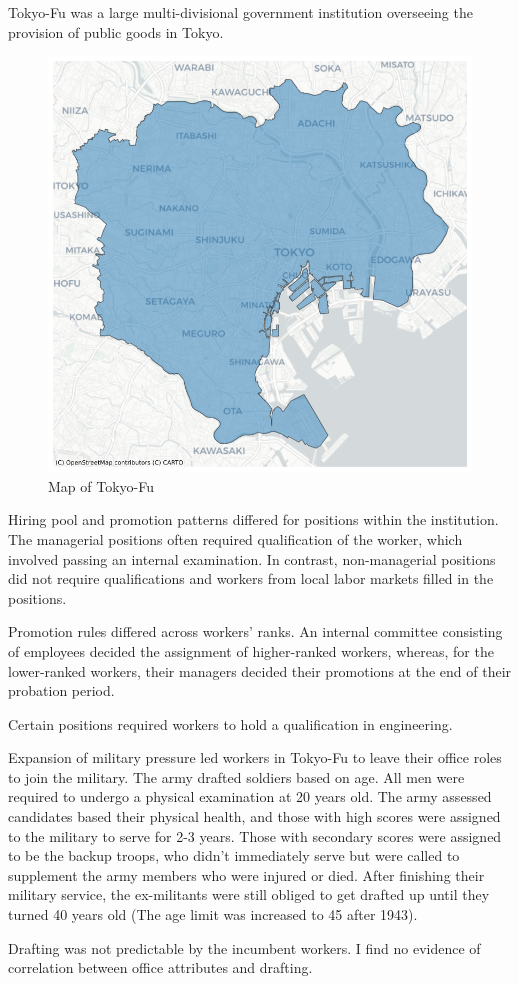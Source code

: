 \item Tokyo-Fu was a large multi-divisional government institution overseeing the provision of public goods in Tokyo.
\begin{figure}
    \centering
    \includegraphics[width = \textwidth]{Background/MapOfTokyoFu.png}
    \caption{Map of Tokyo-Fu}
    \label{fig:enter-label}
\end{figure}

\item Hiring pool and promotion patterns differed for positions within the institution. The managerial positions often required qualification of the worker, which involved passing an internal examination. In contrast, non-managerial positions did not require qualifications and workers from local labor markets filled in the positions.

\item Promotion rules differed across workers' ranks. An internal committee consisting of employees decided the assignment of higher-ranked workers, whereas, for the lower-ranked workers, their managers decided their promotions at the end of their probation period. 

Certain positions required workers to hold a qualification in engineering. 

\item Expansion of military pressure led workers in Tokyo-Fu to leave their office roles to join the military. The army drafted soldiers based on age. All men were required to undergo a physical examination at 20 years old. The army assessed candidates based their physical health, and those with high scores were assigned to the military to serve for 2-3 years. Those with secondary scores were assigned to be the backup troops, who didn’t immediately serve but were called to supplement the army members who were injured or died. After finishing their military service, the ex-militants were still obliged to get drafted up until they turned 40 years old (The age limit was increased to 45 after 1943). 

\item Drafting was not predictable by the incumbent workers. I find no evidence of correlation between office attributes and drafting. 

